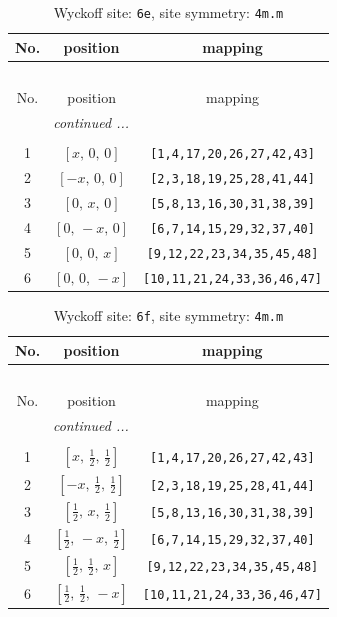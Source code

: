 \documentclass[fleqn,8pt]{jsarticle}
\begin{document}
\renewcommand{\arraystretch}{1.2}
\begin{longtable}{ccc}
\caption{Wyckoff site: {\tt 6e}, site symmetry: {\tt 4m.m}}
 \\
 \hline \hline
No. & position & mapping \\ \hline \endfirsthead

\multicolumn{2}{l}{\tablename\ \thetable{}} \\
 \hline \hline
No. & position & mapping \\ \hline \endhead

 \hline \hline
\multicolumn{2}{r}{\footnotesize\it continued ...} \\ \endfoot

 \hline \hline
\multicolumn{2}{r}{} \\ \endlastfoot

1 & $\left[ x,\, 0,\, 0 \right]$ & {\tt [1,4,17,20,26,27,42,43]} \\ \hline
2 & $\left[ - x,\, 0,\, 0 \right]$ & {\tt [2,3,18,19,25,28,41,44]} \\ \hline
3 & $\left[ 0,\, x,\, 0 \right]$ & {\tt [5,8,13,16,30,31,38,39]} \\ \hline
4 & $\left[ 0,\, - x,\, 0 \right]$ & {\tt [6,7,14,15,29,32,37,40]} \\ \hline
5 & $\left[ 0,\, 0,\, x \right]$ & {\tt [9,12,22,23,34,35,45,48]} \\ \hline
6 & $\left[ 0,\, 0,\, - x \right]$ & {\tt [10,11,21,24,33,36,46,47]} \\
\end{longtable}
\renewcommand{\arraystretch}{1.2}
\begin{longtable}{ccc}
\caption{Wyckoff site: {\tt 6f}, site symmetry: {\tt 4m.m}}
 \\
 \hline \hline
No. & position & mapping \\ \hline \endfirsthead

\multicolumn{2}{l}{\tablename\ \thetable{}} \\
 \hline \hline
No. & position & mapping \\ \hline \endhead

 \hline \hline
\multicolumn{2}{r}{\footnotesize\it continued ...} \\ \endfoot

 \hline \hline
\multicolumn{2}{r}{} \\ \endlastfoot

1 & $\left[ x,\, \frac{1}{2},\, \frac{1}{2} \right]$ & {\tt [1,4,17,20,26,27,42,43]} \\ \hline
2 & $\left[ - x,\, \frac{1}{2},\, \frac{1}{2} \right]$ & {\tt [2,3,18,19,25,28,41,44]} \\ \hline
3 & $\left[ \frac{1}{2},\, x,\, \frac{1}{2} \right]$ & {\tt [5,8,13,16,30,31,38,39]} \\ \hline
4 & $\left[ \frac{1}{2},\, - x,\, \frac{1}{2} \right]$ & {\tt [6,7,14,15,29,32,37,40]} \\ \hline
5 & $\left[ \frac{1}{2},\, \frac{1}{2},\, x \right]$ & {\tt [9,12,22,23,34,35,45,48]} \\ \hline
6 & $\left[ \frac{1}{2},\, \frac{1}{2},\, - x \right]$ & {\tt [10,11,21,24,33,36,46,47]} \\
\end{longtable}
\end{document}
